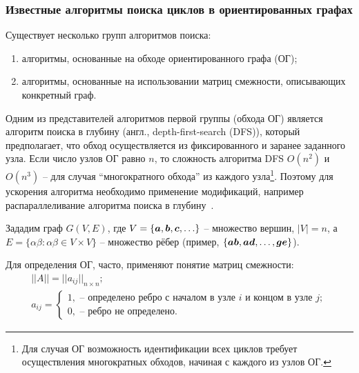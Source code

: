 \def\notedate{2021.11.14}
\def\currentauthor{Муха В. (РК6-73Б)}

\subsubsection{Известные алгоритмы поиска циклов в ориентированных графах}

Существует несколько групп алгоритмов поиска\cite{davidrajuh2016}:
\begin{enumerate}[label=\arabic*)]
    \item алгоритмы, основанные на обходе ориентированного графа (ОГ);
    \item алгоритмы, основанные на использовании матриц смежности, описывающих конкретный граф.
\end{enumerate}

Одним из представителей алгоритмов первой группы (обхода ОГ) является алгоритм поиска в глубину (англ., depth-first-search (DFS)), который предполагает, что обход осуществляется из фиксированного и заранее заданного узла. Если число узлов ОГ равно $n$, то сложность алгоритма DFS $O(n^2)$ и $O(n^3)$ -- для случая ``многократного обхода'' из каждого узла\footnote{Для случая ОГ возможность идентификации всех циклов требует осуществления многократных обходов, начиная с каждого из узлов ОГ.}. Поэтому для ускорения алгоритма необходимо применение модификаций, например распараллеливание алгоритма поиска в глубину~\cite{Mahdi2011}.

Зададим граф $G(V, E)$, где $V = \{\boldsymbol{a}, \boldsymbol{b}, \boldsymbol{c}, \ldots\}$ -- множество вершин, $|V|=n$, а $E = \{\alpha\beta: \alpha\beta\in V\times V\}$ -- множество рёбер (пример, $\{\boldsymbol{ab}, \boldsymbol{ad}, \ldots , \boldsymbol{ge}\}$).

Для определения ОГ, часто, применяют понятие матриц смежности\cite{diestel2012graph}:
\begin{equation}\label{eq.rndhpcedt.2021.11.14.01}
\begin{array}{l}
||A||=||a_{ij}||_{n\times n};\\
a_{ij}=\left\{\begin{array}{l} 1, \mbox{ -- определено ребро с началом в узле $i$ и концом в узле $j$};\\ 0, \mbox{ -- ребро не определено}.\end{array} \right.
\end{array}
\end{equation}

